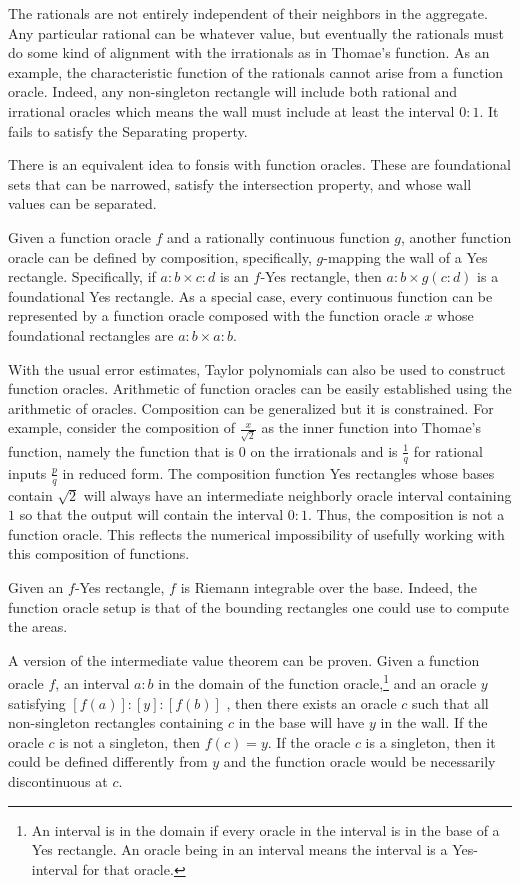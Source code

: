 \documentclass[12pt]{article}
\begin{document}
The rationals are not entirely independent of their neighbors in the aggregate. Any particular rational can be whatever value, but eventually the rationals must do some kind of alignment with the irrationals as in Thomae's function. As an example, the characteristic function of the rationals cannot arise from a function oracle. Indeed, any non-singleton rectangle will include both rational and irrational oracles which means the wall must include at least the interval $0:1$. It fails to satisfy the Separating property. 

There is an equivalent idea to fonsis with function oracles. These are foundational sets that can be narrowed, satisfy the intersection property, and whose wall values can be separated. 

Given a function oracle $f$ and a rationally continuous function $g$, another function oracle can be defined by composition, specifically, $g$-mapping the wall of a Yes rectangle. Specifically, if $a:b \times c:d$ is an $f$-Yes rectangle, then $a:b \times g(c:d)$ is a foundational Yes rectangle. As a special case, every continuous function can be represented by a function oracle composed with the function oracle $x$ whose foundational rectangles are $a:b \times a:b$.

With the usual error estimates, Taylor polynomials can also be used to construct function oracles. Arithmetic of function oracles can be easily established using the arithmetic of oracles. Composition can be generalized but it is constrained. For example, consider the composition of $\frac{x}{\sqrt{2}}$ as the inner function into Thomae's function, namely the function that is 0 on the irrationals and is $\frac{1}{q}$ for rational inputs $\frac{p}{q}$ in reduced form. The composition function Yes rectangles whose bases contain $\sqrt{2}$ will always have an intermediate neighborly oracle interval containing $1$ so that the output will contain the interval $0:1$. Thus, the composition is not a function oracle. This reflects the numerical impossibility of usefully working with this composition of functions.

Given an $f$-Yes rectangle, $f$ is Riemann integrable over the base. Indeed, the function oracle setup is that of the bounding rectangles one could use to compute the areas. 

A version of the intermediate value theorem can be proven. Given a function oracle $f$, an interval $a:b$ in the domain of the function oracle,\footnote{An interval is in the domain if every oracle in the interval is in the base of a Yes rectangle. An oracle being in an interval means the interval is a Yes-interval for that oracle.} and an oracle $y$ satisfying $[f(a)]:[y]:[f(b)]$ , then there exists an oracle $c$ such that all non-singleton rectangles containing $c$ in the base will have $y$ in the wall. If the oracle $c$ is not a singleton, then $f(c) = y$. If the oracle $c$ is a singleton, then it could be defined differently from $y$ and the function oracle would be necessarily discontinuous at $c$. 
\end{document}
